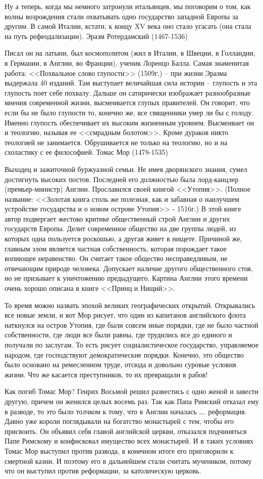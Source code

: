 Ну а теперь, когда мы немного затронули итальянцев, мы поговорим о том, как волны возрождения стали охватывать одно государство западной Европы за другим. В самой Италии, кстати, к концу XV века оно стало угасать (она стала на путь рефеодализации).
Эразм Ротердамский (1467-1536)

Писал он на латыни, был космополитом (жил в Италии, в Швеции, в Голландии, в Германии, в Англии, во Франции), ученик Лоренцо Балла. Самая знаменитая работа: <<Похвальное слово глупости>> (1509г.) – при жизни Эразма выдержала 40 изданий. Там выступает величайшая сила истории – глупость и эта глупость поет себе похвалу. Дальше он сатирически изображает разнообразные мнения современной жизни, высмеивается глупых правителей. Он говорит, что если бы не было глупости то, конечно же, все священники умер ли бы с голоду. Именно глупость обеспечивает их высоким жизненным уровнем. Высмеивает он и теологию, называя ее <<смрадным болотом>>. Кроме дураков никто теологией не занимается. Обрушивается не только на теологию, но и на схоластику с ее философией.
Томас Мор (1478-1535)

Выходец и зажиточной буржуазной семьи. Не имея дворянского знания, сумел достигнуть высоких постов. Последней его должностью была лорд-канцлер (премьер-министр) Англии. Прославился своей книгой <<Утопия>>. (Полное название: <<Золотая книга столь же полезная, как и забавная о наилучшем устройстве государства и о новом острове Утопия>> - 1516г.) В этой книге автор подвергает жестоко критике общественный строй Англии и других государств Европы. Делит современное общество на две группы людей, из которых одна пользуется роскошью, а другая живет в нищете. Причиной же, главным злом является частная собственность, которая порождает такое вопиющее неравенство. Он считает такое общество несправедливым, не отвечающим природе человека. Допускает наличие другого общественного стоя, но не призывает к уничтожению предыдущего. Картина Англии этого времени очень хорошо описана в книге <<Принц и Нищий>>.

То время можно назвать эпохой великих географических открытий. Открывались все новые земли, и вот Мор рисует, что один из капитанов английского флота наткнулся на остров Утопия, где были совсем иные порядки, где не было частной собственности, где люди все были равны, где трудились все до единого и получали по заслугам. То есть рисует социалистическое государство, управляемое народом, где господствуют демократические порядки. Конечно, это общество было основано на ремесленном труде, отсюда и довольно суровые условия жизни. Что же касается преступников, то их превращали в рабов!

Как погиб Томас Мор? Генрих Восьмой решил развестись с одно женой и завести другую, причем он женился целых восемь раз. Так как Папа Римский отказал ему в разводе, то это было толчком к тому, что в Англии началась …. реформация. Давно уже короли поглядывали на богатство монастырей с тем, чтобы его присвоить. Он объявил себя главой английской церкви, отказался подчиняться Папе Римскому и конфисковал имущество всех монастырей. И в таких условиях Томас Мор выступил против развода, в конечном итоге его приговорили к смертной казни. И поэтому его в дальнейшем стали считать мучеником, потому что он выступил против реформации, за католическую церковь.
